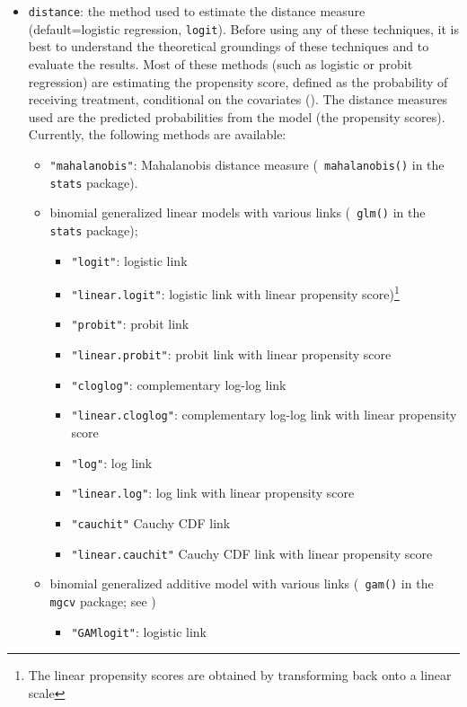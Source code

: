 \begin{itemize}
  
\item \texttt{distance}: the method used to estimate the distance
  measure (default=logistic regression, {\tt logit}).  Before using
  any of these techniques, it is best to understand the theoretical
  groundings of these techniques and to evaluate the results.  Most of
  these methods (such as logistic or probit regression) are estimating
  the propensity score, defined as the probability of receiving
  treatment, conditional on the covariates (\cite{RosRub83}).  The
  distance measures used are the predicted probabilities from the
  model (the propensity scores).  Currently, the following methods are
  available:
  \begin{itemize}
  \item {\tt "mahalanobis"}: Mahalanobis distance measure ({\tt
      mahalanobis()} in the {\tt stats} package).
  \item binomial generalized linear models with various links ({\tt
      glm()} in the {\tt stats} package); 
    \begin{itemize}
    \item \texttt{"logit"}: logistic link 
    \item {\tt "linear.logit"}: logistic link with linear propensity
      score)\footnote{The linear propensity scores are obtained by
        transforming back onto a linear scale}
    \item \texttt{"probit"}: probit link
    \item {\tt "linear.probit"}: probit link with linear propensity
      score
    \item {\tt "cloglog"}: complementary log-log link
    \item {\tt "linear.cloglog"}: complementary log-log link with linear
      propensity score
    \item {\tt "log"}: log link
    \item {\tt "linear.log"}: log link with linear propensity score
    \item {\tt "cauchit"} Cauchy CDF link
    \item {\tt "linear.cauchit"} Cauchy CDF link with linear propensity
      score
    \end{itemize}
  \item binomial generalized additive model with various links ({\tt
      gam()} in the {\tt mgcv} package; see \citet{HasTib90})
    \begin{itemize}
    \item \texttt{"GAMlogit"}: logistic link

\end{itemize}
\end{itemize}
\end{itemize}
